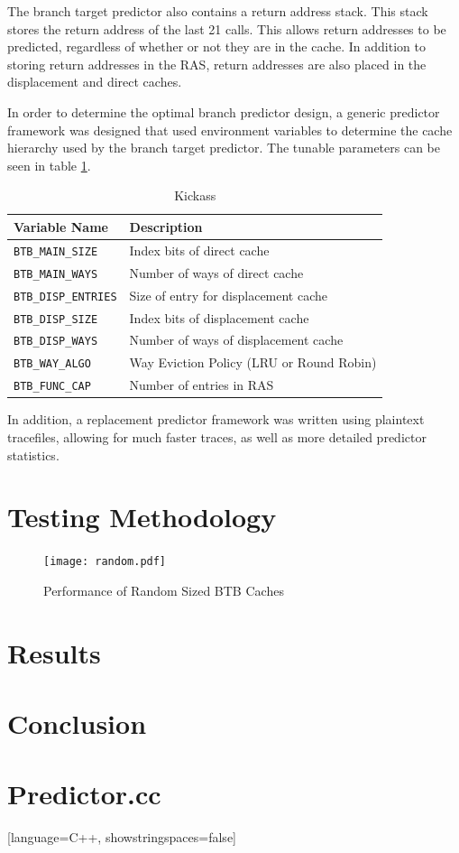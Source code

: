 \documentclass[twocolumn]{article}
\newcommand{\centerimage}[3]{
\begin{figure}[ht!]  
\begin{center}
#1
\caption{#2}
\label{#3}
\end{center}
\end{figure}}
\begin{document}
The branch target predictor also contains a return address stack. This
stack stores the return address of the last 21 calls. This allows
return addresses to be predicted, regardless of whether or not they
are in the cache. In addition to storing return addresses in the RAS,
return addresses are also placed in the displacement and direct
caches. 

In order to determine the optimal branch predictor design, a generic
predictor framework was designed that used environment variables to
determine the cache hierarchy used by the branch target predictor.
The tunable parameters can be seen in table \ref{envars}. 


\begin{table}
\begin{center}\begin{tabular}{p{}p{}}
Variable Name & Description \\
\hline
\texttt{BTB\_MAIN\_SIZE} & Index bits of direct cache \\
\texttt{BTB\_MAIN\_WAYS} & Number of ways of direct cache \\
\texttt{BTB\_DISP\_ENTRIES} & Size of entry for displacement cache \\
\texttt{BTB\_DISP\_SIZE} & Index bits of displacement cache \\
\texttt{BTB\_DISP\_WAYS} & Number of ways of displacement cache \\
\texttt{BTB\_WAY\_ALGO} & Way Eviction Policy (LRU or Round Robin) \\
\texttt{BTB\_FUNC\_CAP} & Number of entries in RAS 
\end{tabular}\end{center}
\caption{Kickass}
\label{envars}
\end{table}

In addition, a replacement predictor framework was written using
plaintext tracefiles, allowing for much faster traces, as well as more
detailed predictor statistics.

\section{Testing Methodology}
\centerimage{\texttt{[image: random.pdf]}}{Performance of Random Sized BTB Caches}{bgraph}
\section{Results}
\section{Conclusion}
\newpage
\onecolumn
\section{Predictor.cc}
[language=C++, showstringspaces=false]
\end{document}
